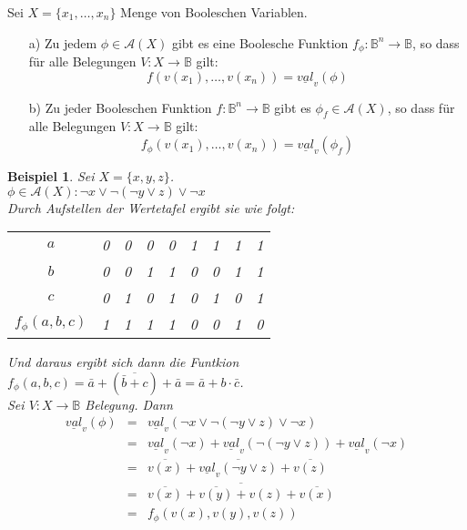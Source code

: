 \documentclass[ngerman]{scrartcl}
\theoremstyle{custom}
\newtheorem{mex}[mdef]{Beispiel}
\newcommand{\ax}{\mathcal{A}(X)}
\newcommand{\val}{\underline{val}_v}
\newcommand{\0}{\mathbf{0}}
\newcommand{\1}{\mathbf{L}}
\begin{document}
Sei $X = \{x_1, \dots, x_n\}$ Menge von Booleschen Variablen. 
\begin{enumerate}
\item[a)] Zu jedem $\phi \in \ax$ gibt es eine Boolesche Funktion
  $f_{\phi}: \mathds{B}^n \rightarrow \mathds{B}$, so dass f\"ur alle
  Belegungen $V: X \rightarrow \mathds{B}$ gilt:
\begin{equation*}
f(v(x_1), \dots, v(x_n)) = \underline{val}_v(\phi)
\end{equation*}
\item[b)] Zu jeder Booleschen Funktion $f: \mathds{B}^n \rightarrow
  \mathds{B}$ gibt es $\phi_f \in \ax$, so dass f\"ur alle Belegungen
  $V: X \rightarrow \mathds{B}$ gilt:
\begin{equation*}
f_{\phi}(v(x_1), \dots, v(x_n)) = \underline{val}_v(\phi_f)
\end{equation*}
\end{enumerate}

\begin{mex}
Sei $X = \{x, y, z\}$.\\
$\phi \in \ax: \neg x \vee \neg (\neg y \vee z) \vee \neg x$\\
Durch Aufstellen der Wertetafel ergibt sie wie folgt:
\begin{tabular}{c|cccccccc}
$a$ & 0 & 0 & 0 & 0 & 1& 1 & 1 &1 \\
$b$ & 0 & 0 & 1 & 1 & 0 & 0 &1 &1 \\
$c$ & 0 & 1 &0 & 1 & 0 & 1 & 0 & 1\\
\hline $f_{\phi}(a,b,c)$ & 1 & 1 & 1 & 1 & 0 & 0  & 1 & 0 
\end{tabular}
Und daraus ergibt sich dann die Funtkion $f_{\phi}(a,b,c)= \bar a + (\overline{\bar b + c})+ \bar a = \bar a +
b \cdot \bar c$.\\

Sei $V: X \rightarrow \mathds{B}$ Belegung. Dann
\begin{eqnarray*}
\underline{val}_v(\phi) & = & \underline{val}_v(\neg x \vee \neg (\neg
y \vee z) \vee \neg x) \\
& = & \underline{val}_v(\neg x) + \val(\neg (\neg y \vee z)) +
\val(\neg x) \\
& = & \overline{v(x)} + \overline{\val(\neg y \vee z)} +
\overline{v(z)} \\
& = & \overline{v(x)} + \overline{\overline{v(y)} + v(z)} +
\overline{v(x)} \\
& = & f_{\phi}(v(x), v(y), v(z))
\end{eqnarray*}
\end{mex}
\end{document}
